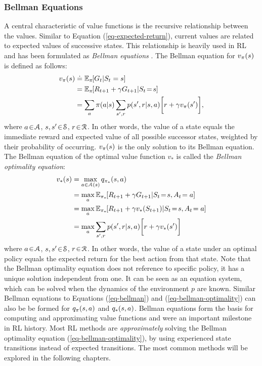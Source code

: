 \documentclass[a4paper, twoside, 12pt]{article}
\let\cite\shortcite
\begin{document}
\subsubsection{Bellman Equations}
\label{sec:orgb363330}
A central characteristic of value functions is the recursive relationship
between the values. Similar to Equation (\ref{eq-expected-return}), current values are
related to expected values of successive states. This relationship is heavily
used in RL and has been formulated as \emph{Bellman equations}
\cite{bellman57_dynam_progr}. The Bellman equation for \(\vpi(s)\) is defined as
follows:
\begin{equation} \label{eq-bellman}
\begin{split}
    \vpi(s) &\defeq \EE{\pi}{G_t|S_t=s} \\
    &= \EE{\pi}{R_{t+1}+\gamma G_{t+1}|S_t\!=\!s} \\
    &= \sum_{a}{\pi(a|s)}\sum_{s',r}{p(s',r|s,a)}\bigg[r+\gamma\vpi(s')\bigg],
\end{split}
\end{equation}
where \(a\!\in\!\A\), \(s,s'\!\in\!\S\), \(r\!\in\!\R\).
In other words, the value of a state equals the immediate reward and expected
value of all possible successor states, weighted by their probability of
occurring. \(\vpi(s)\) is the only solution to its Bellman equation. The Bellman
equation of the optimal value function \(v_*\) is called the \emph{Bellman
optimality equation}:
\begin{equation} \label{eq-bellman-optimality}
\begin{split}
    \vstar(s) &= \max_{a\in\A(s)}q_{\pi_*}(s,a) \\
    &= \max_{a}\EE{\pi_*}{R_{t+1}+\gamma G_{t+1}|S_t\!=\!s, A_t\!=a} \\
    &= \max_{a}\EE{\pi_*}{R_{t+1}+\gamma \vstar(S_{t+1})|S_t\!=\!s, A_t\!=a} \\
    &= \max_{a}\sum_{s',r}{p(s',r|s,a)}\bigg[r+\gamma\vstar(s')\bigg]
\end{split}
\end{equation}
where \(a\!\in\!\A\), \(s,s'\!\in\!\S\), \(r\!\in\!\R\). In other words, the value of
a state under an optimal policy equals the expected return for the best action
from that state. Note that the Bellman optimality equation does not reference to
specific policy, it has a unique solution independent from one. It can be seen
as an equation system, which can be solved when the dynamics of the environment
\(p\) are known. Similar Bellman equations to Equations (\ref{eq-bellman}) and
(\ref{eq-bellman-optimality}) can also be be formed for \(\qpi(s,a)\) and
\(\qstar(s,a)\). Bellman equations form the basis for computing and approximating
value functions and were an important milestone in RL history. Most RL methods
are \emph{approximately} solving the Bellman optimality equation
(\ref{eq-bellman-optimality}), by using experienced state transitions instead of
expected transitions. The most common methods will be explored in the following
chapters.
\end{document}
